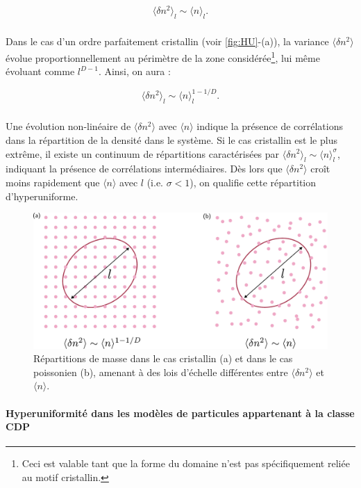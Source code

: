 \begin{equation}
	\langle \delta n^2 \rangle_l \sim \langle n \rangle_l.
\end{equation} 

\subparagraph{}Dans le cas d'un ordre parfaitement cristallin (voir \autoref{fig:HU}-(a)), la variance $\langle \delta n^2 \rangle$ évolue proportionnellement au périmètre de la zone considérée\footnote{Ceci est valable tant que la forme du domaine n'est pas spécifiquement reliée au motif cristallin.}, lui même évoluant comme $l^{D-1}$. Ainsi, on aura :

\begin{equation}
	\langle \delta n^2 \rangle_l \sim \langle n \rangle_l^{1-1/D}.
\end{equation} 

\subparagraph{}Une évolution non-linéaire de $\langle \delta n^2 \rangle$ avec $\langle n \rangle$ indique la présence de corrélations dans la répartition de la densité dans le système. Si le cas cristallin est le plus extrême, il existe un continuum de répartitions caractérisées par $\langle \delta n^2 \rangle_l \sim \langle n \rangle_l^{\sigma}$, indiquant la présence de corrélations intermédiaires. Dès lors que $\langle \delta n^2 \rangle$ croît moins rapidement que $\langle n \rangle$ avec $l$ (i.e. $\sigma < 1$), on qualifie cette répartition d'hyperuniforme.

\begin{figure}[h]
	\centering
	\includegraphics[width=\textwidth]{Chapitre1/Figures/CDP/hyperuniformite.pdf}
	\caption{Répartitions de masse dans le cas cristallin (a) et dans le cas poissonien (b), amenant à des lois d'échelle différentes entre $\langle \delta n^2 \rangle$ et $\langle n \rangle$.}
	\label{fig:HU}
\end{figure}

\paragraph{Hyperuniformité dans les modèles de particules appartenant à la classe CDP}

